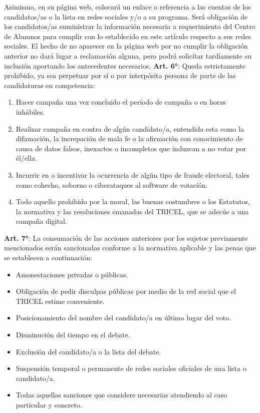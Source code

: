 \documentclass{caitemplate}
\begin{document}
Asimismo, en su página web, colocará un enlace o referencia a las cuentas de los candidatos/as o la lista en redes sociales y/o a su programa. Será obligación de los candidatos/as suministrar la información necesaria a requerimiento del Centro de Alumnos para cumplir con lo establecido en este artículo respecto a sus redes sociales. El hecho de no aparecer en la página web por no cumplir la obligación anterior no dará lugar a reclamación alguna, pero podrá solicitar tardíamente su inclusión aportando los antecedentes necesarios.
\newline
\newpage
\textbf{Art. 6°}: Queda estrictamente prohibido, ya sea perpetuar por sí o por interpósita persona de parte de las candidaturas en competencia:
\begin{enumerate}
    \item Hacer campaña una vez concluido el período de campaña o en horas inhábiles.
    \item Realizar campaña en contra de algún candidato/a, entendida esta como la difamación, la increpación de mala fe o la afirmación con conocimiento de causa de datos falsos, inexactos o incompletos que induzcan a no votar por él/ella.
    \item Incurrir en o incentivar la ocurrencia de algún tipo de fraude electoral, tales como cohecho, soborno o ciberataques al software de votación.
    \item Todo aquello prohibido por la moral, las buenas costumbres o los Estatutos, la normativa y las resoluciones emanadas del TRICEL, que se adecúe a una campaña digital.
\end{enumerate}
\newline
\newline
\textbf{Art. 7°}: La consumación de las acciones anteriores por los sujetos previamente mencionados serán sancionadas conforme a la normativa aplicable y las penas que se establecen a continuación:
\begin{itemize}
    \item Amonestaciones privadas o públicas.
    \item Obligación de pedir disculpas públicas por medio de la red social que el TRICEL estime conveniente.
    \item Posicionamiento del nombre del candidato/a en último lugar del voto.
    \item Disminución del tiempo en el debate.
    \item Exclusión del candidato/a o la lista del debate.
    \item Suspensión temporal o permanente de redes sociales oficiales de una lista o candidato/a.
    \item Todas aquellas sanciones que considere necesarias atendiendo al caso particular y concreto.
\end{itemize}
\end{document}
